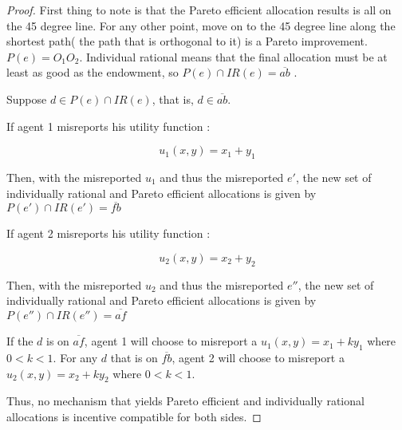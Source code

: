 \begin{proof}
First thing to note is that the Pareto efficient allocation results is
all 
on the 45 degree line. For any other point, move on to the 45 degree
line along the shortest path( the path that is orthogonal to it) is a
Pareto improvement. $P(e)=O_1O_2$.  
Individual rational means that the final allocation must be at least
as good as the endowment, so $P(e) \cap IR(e) = \overline{ab}$ .

Suppose $d \in P(e) \cap IR(e)$, that is, $d \in \overline{ab}$.

If agent 1 misreports his utility function :

$$ u_1(x,y)=x_1 + y_1$$

Then, with the misreported $u_1$ and thus the misreported $e'$, the new set of individually rational and Pareto efficient allocations is given
by $P(e') \cap IR(e') = \overline{fb}$


If agent 2 misreports his utility function :

$$ u_2(x,y)=x_2 + y_2$$

Then, with the misreported $u_2$ and thus the misreported $e''$, the new set of individually rational and Pareto efficient allocations is given
by $P(e'') \cap IR(e'') = \overline{af}$

 If the $d$ is on $\overline{af}$, agent 1 will choose to
misreport a $u_1(x,y)=x_1 + ky_1$ where $0<k<1$. For any $d$ that is on $\overline{fb}$, agent 2 will choose to
misreport a $u_2(x,y)=x_2 + ky_2$ where $0<k<1$. 

Thus, no mechanism that yields Pareto efficient and individually rational allocations is
incentive compatible for both sides.


\end{proof}



